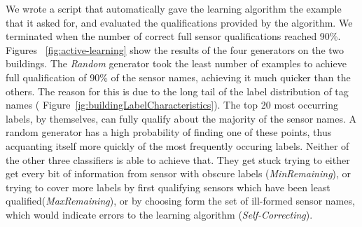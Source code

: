 We wrote a script that automatically gave the learning algorithm the example that it asked for, and evaluated the qualifications provided by the algorithm. We terminated when the number of correct full sensor qualifications reached 90\%. Figures ~\ref{fig:active-learning} show the results of the four generators on the two buildings. The \emph{Random} generator took the least number of examples to achieve full qualification of 90\% of the sensor names, achieving it much quicker than the others. The reason for this is due to the long tail of the label distribution of tag names (  Figure~\ref{ig:buildingLabelCharacteristics}). The top 20 most occurring labels, by themselves, can fully qualify about the majority of the sensor names. A random generator has a high probability of finding one of these points, thus acquanting itself more quickly of the most frequently occuring labels. Neither of the other three classifiers is able to achieve that. They get stuck trying to either get every bit of information from sensor with obscure labels (\emph{MinRemaining}), or trying to cover more labels by first qualifying sensors which have been least qualified(\emph{MaxRemaining}), or by choosing form the set of ill-formed sensor names, which would indicate errors to the learning algorithm (\emph{Self-Correcting}).


